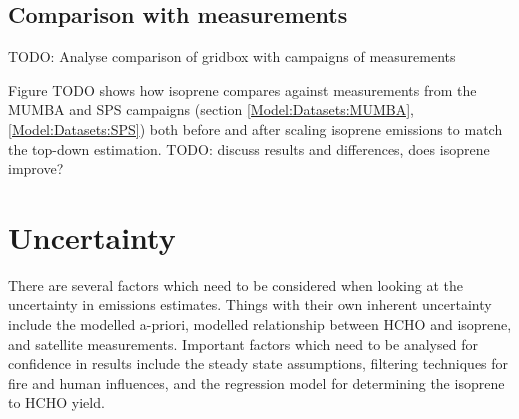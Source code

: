   \subsection{Comparison with measurements}
    
    TODO: %
    Analyse comparison of gridbox with campaigns of measurements
    
  
    Figure TODO shows how isoprene compares against measurements from the MUMBA and SPS campaigns (section \ref{Model:Datasets:MUMBA}, \ref{Model:Datasets:SPS}) both before and after scaling isoprene emissions to match the top-down estimation.
    TODO: discuss results and differences, does isoprene improve?
    

\section{Uncertainty}
\label{BioIsop:Uncertainty}

  There are several factors which need to be considered when looking at the uncertainty in emissions estimates.
  Things with their own inherent uncertainty include the modelled a-priori, modelled relationship between HCHO and isoprene, and satellite measurements.
  Important factors which need to be analysed for confidence in results include the steady state assumptions, filtering techniques for fire and human influences, and the regression model for determining the isoprene to HCHO yield.
  
